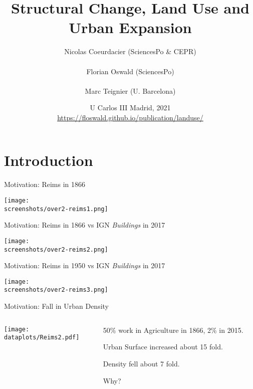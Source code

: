 \documentclass[aspectratio=169]{beamer}
\begin{document}
\title{\textbf{Structural Change, Land Use and Urban Expansion}}
\author{Nicolas Coeurdacier (SciencesPo \& CEPR)\\ \ \\Florian Oswald (SciencesPo) \\ \ \\ Marc Teignier (U. Barcelona)}
\date{U Carlos III Madrid, 2021\\\bigskip\url{https://floswald.github.io/publication/landuse/}}


\frame{\titlepage}



\section{Introduction}

\begin{frame}{Motivation: Reims in 1866}
\begin{adjustbox}{center}
\texttt{[image: \\screenshots/over2-reims1.png]}\end{adjustbox}
\end{frame}

\begin{frame}{Motivation: Reims in 1866 vs IGN \emph{Buildings} in 2017}
\begin{adjustbox}{center}
\texttt{[image: \\screenshots/over2-reims2.png]}\end{adjustbox}
\end{frame}

\begin{frame}{Motivation: Reims in 1950 vs IGN \emph{Buildings} in 2017}
\begin{adjustbox}{center}
\texttt{[image: \\screenshots/over2-reims3.png]}\end{adjustbox}
\end{frame}

\begin{frame}{Motivation: Fall in Urban Density}
\begin{columns}
\begin{column}{0.7\textwidth}
\texttt{[image: \\dataplots/Reims2.pdf]}
\end{column}
\begin{column}{0.3\textwidth}
\begin{midi}
\item 50\% work in Agriculture in 1866, 2\% in 2015.
\item Urban Surface increased about 15 fold.
\item Density fell about 7 fold.
\item Why?
\end{midi}

\end{column}
\end{columns}
\end{frame}
\end{document}
